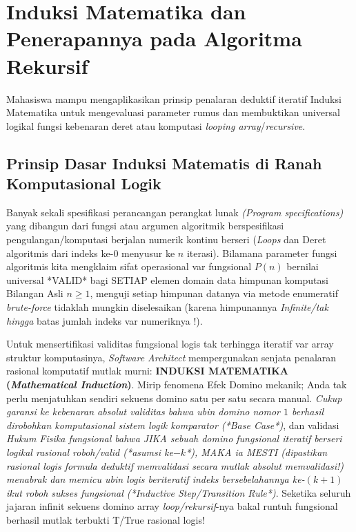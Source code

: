 \documentclass[../main.tex]{subfiles}
\begin{document}
\chapter{Induksi Matematika dan Penerapannya pada Algoritma Rekursif}

\begin{subcpmk}
  \item Mahasiswa mampu mengaplikasikan prinsip penalaran deduktif iteratif Induksi Matematika untuk mengevaluasi parameter rumus dan membuktikan universal logikal fungsi kebenaran deret atau komputasi \textit{looping array}/\textit{recursive}.
\end{subcpmk}

\section{Prinsip Dasar Induksi Matematis di Ranah Komputasional Logik}

Banyak sekali spesifikasi perancangan perangkat lunak \textit{(Program specifications)} yang dibangun dari fungsi atau argumen algoritmik berspesifikasi pengulangan/komputasi berjalan numerik kontinu berseri (\textit{Loops} dan Deret algoritmis dari indeks ke-0 menyusur ke $n$ iterasi). Bilamana parameter fungsi algoritmis kita mengklaim sifat operasional var fungsional $P(n)$ bernilai universal *VALID* bagi SETIAP elemen domain data himpunan komputasi Bilangan Asli $n \geq 1$, menguji setiap himpunan datanya via metode enumeratif \textit{brute-force} tidaklah mungkin diselesaikan (karena himpunannya \textit{Infinite/tak hingga} batas jumlah indeks var numeriknya !).

Untuk mensertifikasi validitas fungsional logis tak terhingga iteratif var array struktur komputasinya, \textit{Software Architect} mempergunakan senjata penalaran rasional komputatif mutlak murni: \textbf{INDUKSI MATEMATIKA (\textit{Mathematical Induction})}.
Mirip fenomena Efek Domino mekanik; Anda tak perlu menjatuhkan sendiri sekuens domino satu per satu secara manual. \textit{Cukup garansi ke kebenaran absolut validitas bahwa ubin domino nomor $1$ berhasil dirobohkan komputasional sistem logik komparator (*Base Case*)}, dan validasi \textit{Hukum Fisika fungsional bahwa JIKA sebuah domino fungsional iteratif berseri logikal rasional roboh/valid (*asumsi ke$-k$*), MAKA ia MESTI (dipastikan rasional logis formula deduktif memvalidasi secara mutlak absolut memvalidasi!) menabrak dan memicu ubin logis beriteratif indeks bersebelahannya ke-$(k+1)$ ikut roboh sukses fungsional (*Inductive Step/Transition Rule*)}. Seketika seluruh jajaran infinit sekuens domino array \textit{loop/rekursif}-nya bakal runtuh fungsional berhasil mutlak terbukti T/True rasional logis!
\end{document}
